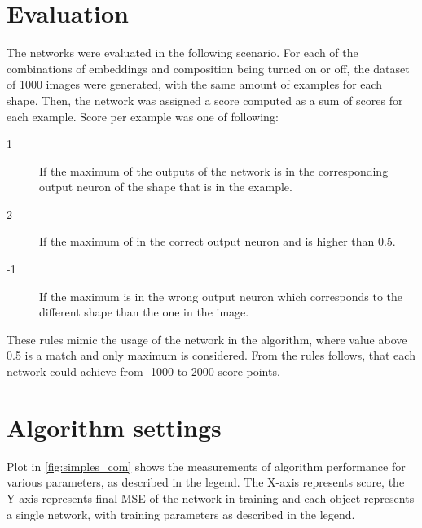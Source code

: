 \begin{description}
\begin{description}
\section{Evaluation}
The networks were evaluated in the following scenario. For each of the combinations of embeddings and composition being turned on or off, the dataset of 1000 images were generated, with the same amount of examples for each shape. Then, the network was assigned a score computed as a sum of scores for each example. Score per example was one of following:

\begin{description}
\item [1] If the maximum of the outputs of the network is in the corresponding output neuron of the shape that is in the example.
\item [2] If the maximum of in the correct output neuron and is higher than 0.5.
\item [-1] If the maximum is in the wrong output neuron which corresponds to the different shape than the one in the image.
\end{description}

These rules mimic the usage of the network in the algorithm, where value above 0.5 is a match and only maximum is considered. From the rules follows, that each network could achieve from -1000 to 2000 score points. 

\section{Algorithm settings}
Plot in \cref{fig:simples_com} shows the measurements of algorithm performance for various parameters, as described in the legend. The X-axis represents score, the Y-axis represents final MSE of the network in training and each object represents a single network, with training parameters as described in the legend.


\end{description}
\end{description}
